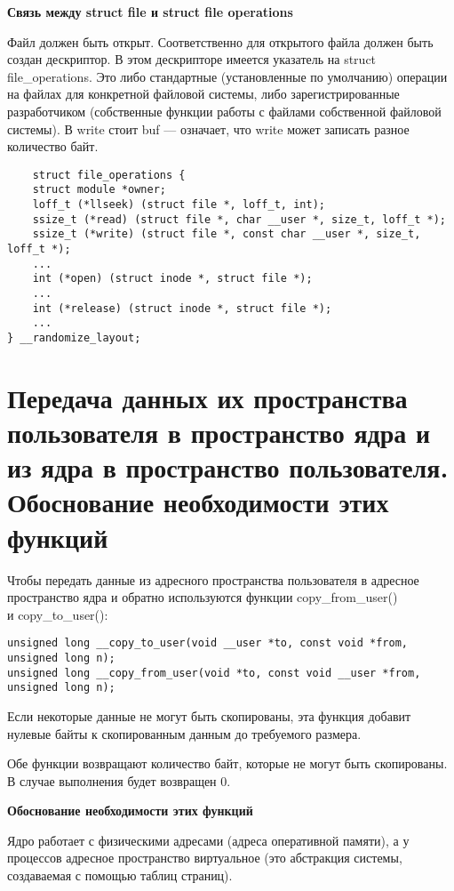 \textbf{Связь между struct file и struct file operations}

Файл должен быть открыт. Соответственно для открытого файла должен быть создан дескриптор. В этом дескрипторе имеется указатель на struct file\_operations. Это либо стандартные (установленные по умолчанию) операции на файлах для конкретной файловой системы, либо зарегистрированные разработчиком (собственные функции работы с файлами собственной файловой системы). В write стоит buf --- означает, что write может записать разное количество байт.

\begin{lstlisting}
	struct file_operations {
	struct module *owner;
	loff_t (*llseek) (struct file *, loff_t, int);
	ssize_t (*read) (struct file *, char __user *, size_t, loff_t *);
	ssize_t (*write) (struct file *, const char __user *, size_t, loff_t *);
	...
	int (*open) (struct inode *, struct file *);
	...
	int (*release) (struct inode *, struct file *);
	...
} __randomize_layout;
\end{lstlisting}

\section{Передача данных их пространства пользователя в пространство ядра и из ядра в пространство пользователя. Обоснование необходимости этих функций}

Чтобы передать данные из адресного пространства пользователя в адресное пространство ядра и обратно используются функции copy\_from\_user() \\ и copy\_to\_user():

\begin{lstlisting}
unsigned long __copy_to_user(void __user *to, const void *from, unsigned long n);
unsigned long __copy_from_user(void *to, const void __user *from, unsigned long n);
\end{lstlisting}

Если некоторые данные не могут быть скопированы, эта функция добавит нулевые байты к скопированным данным до требуемого размера.

Обе функции возвращают количество байт, которые не могут быть скопированы. В случае выполнения будет возвращен 0.

\textbf{Обоснование необходимости этих функций}

Ядро работает с физическими адресами (адреса оперативной памяти), а у процессов адресное пространство виртуальное (это абстракция системы, создаваемая с помощью таблиц страниц).

